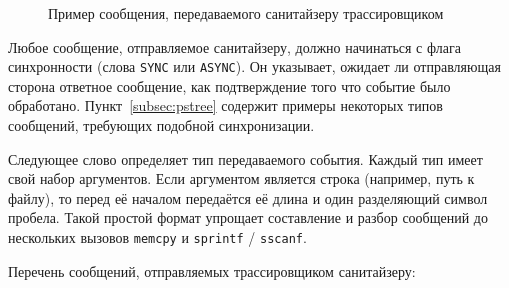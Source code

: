 \begin{figure}[H]

    \caption{Пример сообщения, передаваемого санитайзеру трассировщиком}
\end{figure}

Любое сообщение, отправляемое санитайзеру, должно начинаться с флага синхронности (слова \texttt{SYNC} или \texttt{ASYNC}). Он указывает, ожидает ли отправляющая сторона ответное сообщение, как подтверждение того что событие было обработано. Пункт~\ref{subsec:pstree} содержит примеры некоторых типов сообщений, требующих подобной синхронизации.

Следующее слово определяет тип передаваемого события. Каждый тип имеет свой набор аргументов. Если аргументом является строка (например, путь к файлу), то перед её началом передаётся её длина и один разделяющий символ пробела. Такой простой формат упрощает составление и разбор сообщений до нескольких вызовов \texttt{memcpy} и \texttt{sprintf} / \texttt{sscanf}.

Перечень сообщений, отправляемых трассировщиком санитайзеру:

